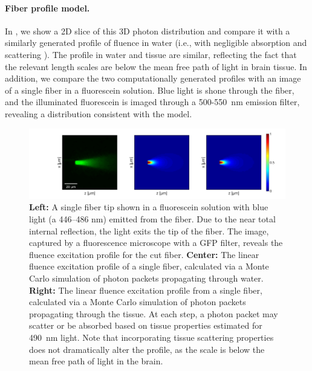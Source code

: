 \paragraph{Fiber profile model.} In , we show a 2D slice of this 3D photon distribution and compare it with a similarly generated profile of fluence in water (i.e., with negligible absorption and scattering \cite{DandAInstrumentCompanytextLindaWorltonlayout:2008vo}). The profile in water and tissue are similar, reflecting the fact that the relevant length scales are below the mean free path of light in brain tissue. In addition, we compare the two computationally generated profiles with an image of a single fiber in a fluorescein solution. Blue light is shone through the fiber, and the illuminated fluorescein is imaged through a 500-550~nm emission filter, revealing a distribution consistent with the model.

\begin{figure}
\includegraphics[width=\textwidth]{fig2-profile2.pdf}
\caption[Comparison of light profile with model results]{\textbf{Left:} A single fiber tip shown in a fluorescein solution with blue light (a 446--486 nm) emitted from the fiber. Due to the near total internal reflection, the light exits the tip of the fiber. The image, captured by a fluorescence microscope with a GFP filter, reveals the fluence excitation profile for the cut fiber. \textbf{Center:} The linear fluence excitation profile of a single fiber, calculated via a Monte Carlo simulation of photon packets propagating through water. \textbf{Right:} The linear fluence excitation profile from a single fiber, calculated via a Monte Carlo simulation of photon packets propagating through the tissue. At each step, a photon packet may scatter or be absorbed based on tissue properties estimated for 490~nm light. Note that incorporating tissue scattering properties does not dramatically alter the profile, as the scale is below the mean free path of light in the brain.}
\label{fig:profile}
\end{figure}

